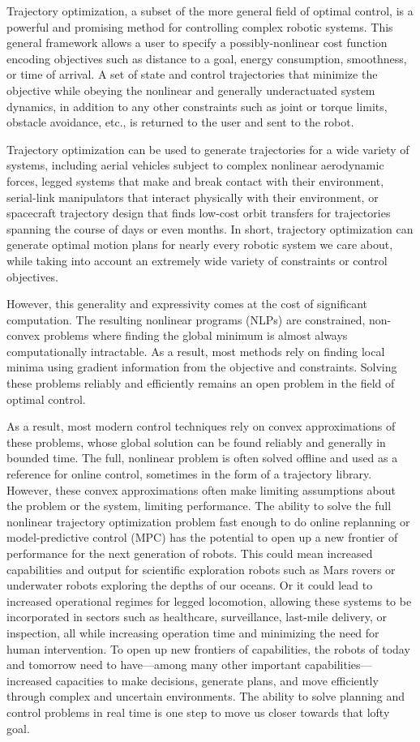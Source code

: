 \documentclass[../root.tex]{subfiles}
\begin{document}
Trajectory optimization, a subset of the more general field of optimal
control, is a powerful and promising method for controlling complex robotic
systems. This general framework allows a user to specify a possibly-nonlinear
cost function encoding objectives such as distance to a goal, energy
consumption, smoothness, or time of arrival. A set of state and control
trajectories that minimize the objective while obeying the nonlinear and
generally underactuated system dynamics, in addition to any other constraints
such as joint or torque limits, obstacle avoidance, etc., is returned to the
user and sent to the robot.

Trajectory optimization can be used to generate trajectories for a wide
variety of systems, including aerial vehicles subject to complex nonlinear
aerodynamic forces, legged systems that make and break contact with their
environment, serial-link manipulators that interact physically with their
environment, or spacecraft trajectory design that finds low-cost orbit
transfers for trajectories spanning the course of days or even months. In
short, trajectory optimization can generate optimal motion plans for nearly
every robotic system we care about, while taking into account an extremely
wide variety of constraints or control objectives.

However, this generality and expressivity comes at the cost of significant
computation. The resulting nonlinear programs (NLPs) are constrained,
non-convex problems where finding the global minimum is almost always
computationally intractable. As a result, most methods rely on finding local
minima using gradient information from the objective and constraints. Solving
these problems reliably and efficiently remains an open problem in the field
of optimal control.

As a result, most modern control techniques rely on convex approximations of
these problems, whose global solution can be found reliably and generally in
bounded time. The full, nonlinear problem is often solved offline and used as a
reference for online control, sometimes in the form of a trajectory library.
However, these convex approximations often make limiting assumptions about the
problem or the system, limiting performance. The ability to solve the full
nonlinear trajectory optimization problem fast enough to do online replanning or
model-predictive control (MPC) has the potential to open up a new frontier of
performance for the next generation of robots. This could mean increased
capabilities and output for scientific exploration robots such as Mars rovers or
underwater robots exploring the depths of our oceans. Or it could lead to
increased operational regimes for legged locomotion, allowing these systems to
be incorporated in sectors such as healthcare, surveillance, last-mile delivery,
or inspection, all while increasing operation time and minimizing the need for
human intervention. To open up new frontiers of capabilities, the robots of
today and tomorrow need to have---among many other important 
capabilities---increased capacities to make decisions, generate plans, and move
efficiently through complex and uncertain environments. The ability to solve
planning and control problems in real time is one step to move us closer towards
that lofty goal.
\end{document}
